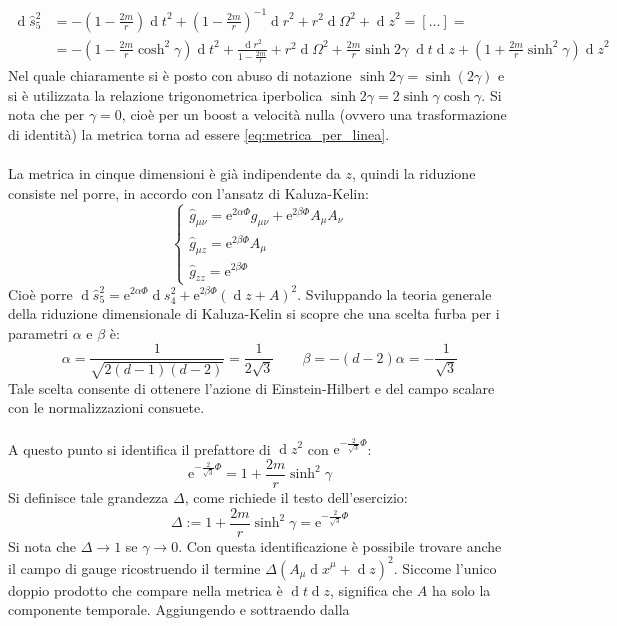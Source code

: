 \documentclass[]{scrartcl}
\newcommand{\me}{\mathrm{e}}
\newcommand{\hg}{\hat{g}}
\renewcommand{\d}[1]{\ensuremath{\operatorname{d}\!{#1}}}
\begin{document}
\begin{align*}
  \d{\hat{s}^2_5} & = - \left( 1 - \frac{2m}{r} \right) \d t^2 + \left( 1 - \frac{2m}{r} \right)^{-1} \d r^2 + r^2 \d \Omega^2 + \d z^2 = [\dots] = \\
                  & = - \left( 1 - \frac{2m}{r} \cosh^2 \gamma \right) \d t^2 + \frac{\d r^2}{1 - \frac{2m}{r}} + r^2 \d \Omega^2 +
                 \frac{2m}{r}\sinh 2\gamma \; \d t \d z + \left(1 + \frac{2m}{r}\sinh^2 \gamma \right) \d z^2
\end{align*}
Nel quale chiaramente si è posto con abuso di notazione $ \sinh 2 \gamma = \sinh (2\gamma) $ e si è utilizzata la relazione trigonometrica
iperbolica $ \sinh 2\gamma = 2 \sinh \gamma \cosh \gamma $. Si nota che per $ \gamma = 0 $,
cioè per un boost a velocità nulla (ovvero una trasformazione di identità) la metrica torna ad essere \eqref{eq:metrica_per_linea}. \\ \\
La metrica in cinque dimensioni è già indipendente da $ z $, quindi la riduzione consiste nel porre, in accordo con l'ansatz di Kaluza-Kelin:
\[
  \begin{cases}
    \hg_{\mu\nu} = \me^{2\alpha\Phi}g_{\mu\nu} + \me^{2\beta\Phi}A_\mu A_\nu \\
    \hg_{\mu z} = \me^{2\beta\Phi} A_\mu \\
    \hg_{zz} = \me^{2\beta\Phi}
  \end{cases}
\]
Cioè porre $ \d{\hat{s}^2_5} = \me^{2\alpha\Phi} \d{s^2_4} + \me^{2\beta\Phi}\left( \d z + A \right)^2 $. Sviluppando la teoria generale della riduzione
dimensionale di Kaluza-Kelin si scopre che una scelta furba per i parametri $ \alpha $ e $ \beta $ è:
\[
  \alpha = \frac{1}{\sqrt{2(d-1)(d-2)}} = \frac{1}{2\sqrt{3}} \qquad \beta = -(d-2)\alpha = - \frac{1}{\sqrt{3}}
\]
Tale scelta consente di ottenere l'azione di Einstein-Hilbert e del campo scalare con le normalizzazioni consuete. \\ \\
A questo punto si identifica il prefattore di $ \d z^2 $ con $ \me^{-\frac{2}{\sqrt{3}}\Phi} $:
\[
  \me^{-\frac{2}{\sqrt{3}}\Phi} = 1 + \frac{2m}{r}\sinh^2 \gamma
\]
Si definisce tale grandezza $ \Delta $, come richiede il testo dell'esercizio:
\[
  \Delta := 1 + \frac{2m}{r}\sinh^2 \gamma = \me^{-\frac{2}{\sqrt{3}}\Phi}
\]
Si nota che $ \Delta \to 1 $ se $ \gamma \to 0 $.
Con questa identificazione è possibile trovare anche il campo di gauge ricostruendo il termine $ \Delta (A_\mu \d x^\mu + \d z)^2 $. Siccome l'unico
doppio prodotto che compare nella metrica è $ \d t \d z $, significa che $ A $ ha solo la componente temporale. Aggiungendo e sottraendo dalla
\end{document}
